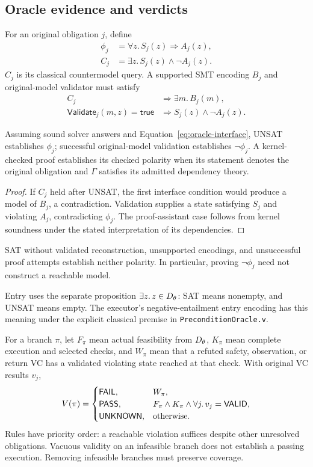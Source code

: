 \subsection{Oracle evidence and verdicts}
For an original obligation $j$, define
\[
\begin{aligned}
 \phi_j&=\forall z.\,S_j(z)\Rightarrow A_j(z),\\
 C_j&=\exists z.\,S_j(z)\land\neg A_j(z).
\end{aligned}
\]
$C_j$ is its classical countermodel query. A supported SMT encoding
$B_j$ and original-model validator must satisfy
\begin{equation}
\label{eq:oracle-interface}
\begin{aligned}
 C_j&\Rightarrow\exists m.\,B_j(m),\\
 \mathsf{Validate}_j(m,z)=\mathsf{true}
   &\Rightarrow S_j(z)\land\neg A_j(z).
\end{aligned}
\end{equation}

\begin{proposition}
\label{prop:oracle-soundness}
Assuming sound solver answers and
Equation~\eqref{eq:oracle-interface}, UNSAT establishes $\phi_j$;
successful original-model validation establishes $\neg\phi_j$.
A kernel-checked proof establishes its checked polarity when its
statement denotes the original obligation and $\Gamma$ satisfies
its admitted dependency theory.
\end{proposition}
\begin{proof}
If $C_j$ held after UNSAT, the first interface condition would produce
a model of $B_j$, a contradiction. Validation supplies a state
satisfying $S_j$ and violating $A_j$, contradicting $\phi_j$.
The proof-assistant case follows from kernel soundness under the stated
interpretation of its dependencies.
\end{proof}
SAT without validated reconstruction, unsupported encodings, and
unsuccessful proof attempts establish neither polarity.
In particular, proving $\neg\phi_j$ need not construct a reachable model.

Entry uses the separate proposition $\exists z.\,z\in D_\theta$:
SAT means nonempty, and UNSAT means empty.
The executor's negative-entailment entry encoding has this meaning
under the explicit classical premise in \texttt{PreconditionOracle.v}.

For a branch $\pi$, let $F_\pi$ mean actual feasibility from $D_\theta$,
$K_\pi$ mean complete execution and selected checks, and $W_\pi$ mean
that a refuted safety, observation, or return VC has a validated
violating state reached at that check. With original VC results $v_j$,
\[
 V(\pi)=
 \begin{cases}
  \textsf{FAIL}, & W_\pi,\\
  \textsf{PASS}, & F_\pi\land K_\pi
                  \land\forall j.\,v_j=\textsf{VALID},\\
  \textsf{UNKNOWN}, & \text{otherwise}.
 \end{cases}
\]
Rules have priority order: a reachable violation suffices despite other
unresolved obligations. Vacuous validity on an infeasible branch does
not establish a passing execution. Removing infeasible branches must
preserve coverage.

